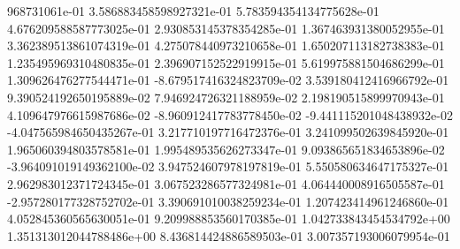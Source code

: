 968731061e-01	3.586883458598927321e-01	5.783594354134775628e-01	4.676209588587773025e-01	2.930853145378354285e-01	1.367463931380052955e-01	3.362389513861074319e-01	4.275078440973210658e-01	1.650207113182738383e-01	1.235495969310480835e-01	2.396907152522919915e-01	5.619975881504686299e-01	1.309626476277544471e-01	-8.679517416324823709e-02	3.539180412416966792e-01	9.390524192650195889e-02	7.946924726321188959e-02	2.198190515899970943e-01	4.109647976615987686e-02	-8.960912417783778450e-02	-9.441115201048438932e-02	-4.047565984650435267e-01	3.217710197716472376e-01	3.241099502639845920e-01	1.965060394803578581e-01	1.995489535626273347e-01	9.093865651834653896e-02	-3.964091019149362100e-02	3.947524607978197819e-01	5.550580634647175327e-01	2.962983012371724345e-01	3.067523286577324981e-01	4.064440008916505587e-01	-2.957280177328752702e-01	3.390691010038259234e-01	1.207423414961246860e-01	4.052845360565630051e-01	9.209988853560170385e-01	1.042733843454534792e+00	1.351313012044788486e+00	8.436814424886589503e-01	3.007357193006079954e-01
